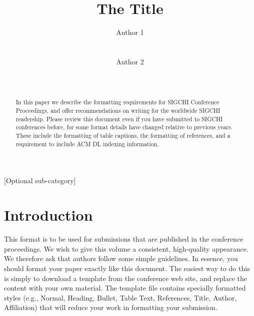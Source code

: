 \documentclass{chi2009}
\begin{document}
\setlength{\paperheight}{11in}
\setlength{\paperwidth}{8.5in}
\setlength{\pdfpageheight}{\paperheight}
\setlength{\pdfpagewidth}{\paperwidth}


\title{The Title}
\author{
  \alignauthor Author 1\\
    \\
    \\
  \alignauthor Author 2\\
    \\
    \\
}

\maketitle

\begin{abstract}
  In this paper we describe the formatting requirements for SIGCHI
  Conference Proceedings, and offer recommendations on writing for the
  worldwide SIGCHI readership.  Please review this document even if
  you have submitted to SIGCHI conferences before, for some format
  details have changed relative to previous years. These include the
  formatting of table captions, the formatting of references, and a
  requirement to include ACM DL indexing information.
\end{abstract}


[Optional sub-category]

\section{Introduction}

This format is to be used for submissions that are published in the
conference proceedings.  We wish to give this volume a consistent,
high-quality appearance. We therefore ask that authors follow some
simple guidelines. In essence, you should format your paper exactly
like this document. The easiest way to do this is simply to download a
template from the conference web site, and replace the content with
your own material. The template file contains specially formatted
styles (e.g., Normal, Heading, Bullet, Table Text, References, Title,
Author, Affiliation) that will reduce your work in formatting your
submission.
\end{document}
